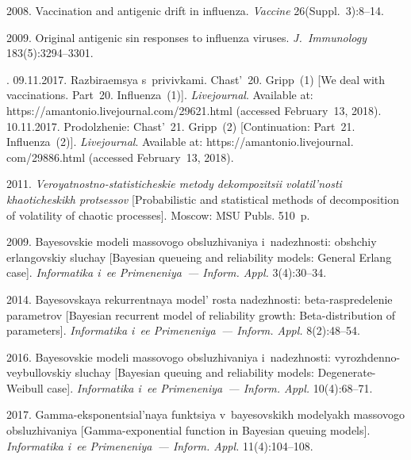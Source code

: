 \begin{multicols}{2}
{{\begin{thebibliography}{99}
 2008. Vaccination and antigenic drift in influenza. 
\textit{Vaccine} 26(Suppl.~3):8--14.

 2009. 
Original antigenic sin responses to influenza viruses. \textit{J.~Immunology} 183(5):3294--3301.

.  09.11.2017. Razbiraemsya s~privivkami. Chast'~20. Gripp~(1) 
[We deal with vaccinations. Part~20. Influenza~(1)]. \textit{Livejournal}. 
Available at: {\sf https://\linebreak amantonio.livejournal.com/29621.html} 
(accessed February~13, 2018). 10.11.2017.
Prodolzhenie: Chast'~21. Gripp~(2) [Continuation: Part~21. Influenza~(2)]. 
\textit{Livejournal}.  Available at: 
{\sf https://amantonio.livejournal. com/29886.html} (accessed February~13, 2018).

 2011. \textit{Veroyatnostno-statisticheskie metody dekompozitsii 
volatil'nosti khaoticheskikh protsessov} [Probabilistic and statistical methods 
of decomposition of volatility of chaotic processes]. Moscow: MSU Publs. 510~p.

 2009. 
Bayesovskie modeli massovogo obsluzhivaniya i~nadezhnosti: obshchiy erlangovskiy 
sluchay [Bayesian queueing and reliability models: General Erlang case]. 
\textit{Informatika i~ee Primeneniya~--- Inform. Appl.} 3(4):30--34.

 2014. 
Bayesovskaya rekurrentnaya mo\-del' rosta nadezhnosti: beta-raspredelenie parametrov 
[Bayesian recurrent model of reliability growth: Beta-distribution of parameters]. 
\textit{Informatika i~ee Primeneniya~--- Inform. Appl.} 8(2):48--54.

 2016. Bayesovskie modeli 
massovogo obsluzhivaniya i~nadezhnosti: vyrozhdenno-veybullovskiy sluchay  
[Bayesian queuing and reliability models: Degenerate-Weibull case]. 
\textit{Informatika i~ee Primeneniya~--- Inform. Appl.} 10(4):68--71.

 2017. Gamma-eksponentsial'naya funktsiya v~bayesovskikh modelyakh 
 massovogo obsluzhivaniya [Gamma-exponential function in Bayesian queuing models]. 
 \textit{Informatika i~ee Primeneniya~--- Inform. Appl.} 11(4):104--108.


\end{thebibliography}}}
\end{multicols}
